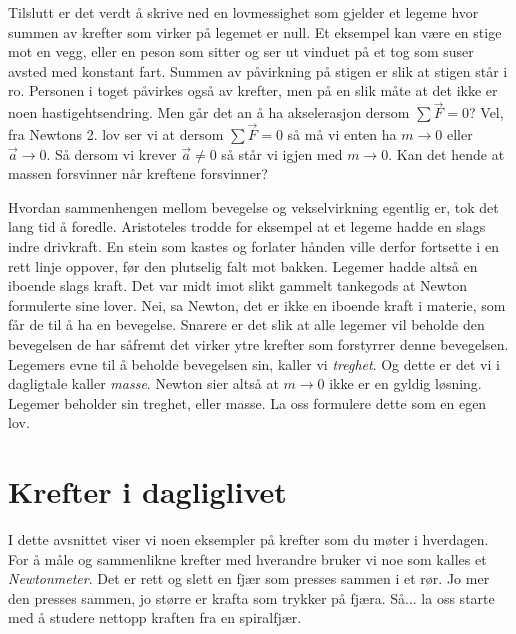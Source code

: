 Tilslutt er det verdt å skrive ned en lovmessighet som gjelder et legeme hvor summen av krefter som virker på legemet er null. Et eksempel kan være en stige mot en vegg, eller en peson som sitter og ser ut vinduet på et tog som suser avsted med konstant fart. Summen av påvirkning på stigen er slik at stigen står i ro. Personen i toget påvirkes også av krefter, men på en slik måte at det ikke er noen hastigehtsendring. Men går det an å ha akselerasjon dersom $\sum\vec{F}=0$? Vel, fra Newtons 2. lov ser vi at dersom $\sum\vec{F}=0$ så må vi enten ha $m\to 0$ eller $\vec{a}\to 0$. Så dersom vi krever $\vec{a}\neq 0$ så står vi igjen med $m\to 0$. Kan det hende at massen forsvinner når kreftene forsvinner? 

Hvordan sammenhengen mellom bevegelse og vekselvirkning egentlig er, tok det lang tid å foredle. Aristoteles trodde for eksempel at et legeme hadde en slags indre drivkraft. En stein som kastes og forlater hånden ville derfor fortsette i en rett linje oppover, før den plutselig falt mot bakken. Legemer hadde altså en iboende slags kraft. Det var midt imot slikt gammelt tankegods at Newton formulerte sine lover. Nei, sa Newton, det er ikke en iboende kraft i materie, som får de til å ha en bevegelse. Snarere er det slik at alle legemer vil beholde den bevegelsen de har såfremt det virker ytre krefter som forstyrrer denne bevegelsen. Legemers evne til å beholde bevegelsen sin, kaller vi \textit{treghet}. Og dette er det vi i dagligtale kaller \textit{masse}. Newton sier altså at $m\to0$ ikke er en gyldig løsning. Legemer beholder sin treghet, eller masse. La oss formulere dette som en egen lov.





\section{Krefter i dagliglivet}
I dette avsnittet viser vi noen eksempler på krefter som du møter i hverdagen.
For å måle og sammenlikne krefter med hverandre bruker vi noe som kalles et \textit{Newtonmeter}. Det er rett og slett en fjær som presses sammen i et rør. Jo mer den presses sammen, jo større er krafta som trykker på fjæra. Så... la oss starte med å studere nettopp kraften fra en spiralfjær.

